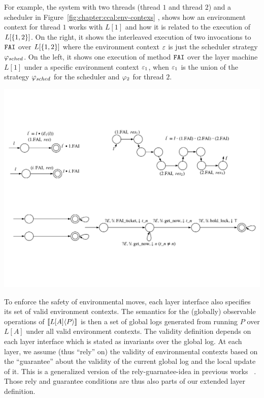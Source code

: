 For example, 
the system with two threads
(thread $1$ and thread $2$) and a scheduler in Figure~\ref{fig:chapter:ccal:env-contexs} ,
shows how
an environment context for thread $1$ works with $L[1]$
and how it is related to the execution of  $L[\{1,2\}]$.
On the right, it shows the interleaved execution of
two invocations to ${\mathrm{\texttt{FAI}}}$ over $L[\{1, 2\}]$
where the environment context $\oracle$ is just the scheduler
strategy $\varphi_{sched}$.
On the left, it shows one execution
of method ${\mathrm{\texttt{FAI}}}$ over the layer machine $L[1]$ under a specific
environment context $\oracle_1$, when $\oracle_1$ is the union of
the strategy $\varphi_{sched}$ for the scheduler and $\varphi_{2}$ for
thread $2$. 
\begin{center}
\includegraphics[scale=.8]{figs/ccal/faiexamplewithcontext}
\end{center}

To enforce the safety of environmental moves,
each layer interface also specifies its set of valid environment contexts.
The semantics for the (globally) observable operations of $[\![{L[A]} \langle {P} \rangle]\!]$ is then a set of global logs
generated from running $P$ over $L[A]$ under all valid
environment contexts. 
The validity definition depends on each layer interface which is stated as invariants over the global log. 
At each layer, we assume (thus ``rely'' on) the validity of environmental contexts based on the ``guarantee'' about the validity of the current global log and the local update of it. 
This is a generalized version of the rely-guarnatee-idea in previous works ~\cite{feng07:sagl,vafeiadis:marriage,LRG,fu10:roch,sergey15}. 
Those rely and guarantee conditions
are thus also parts of our extended layer definition. 

